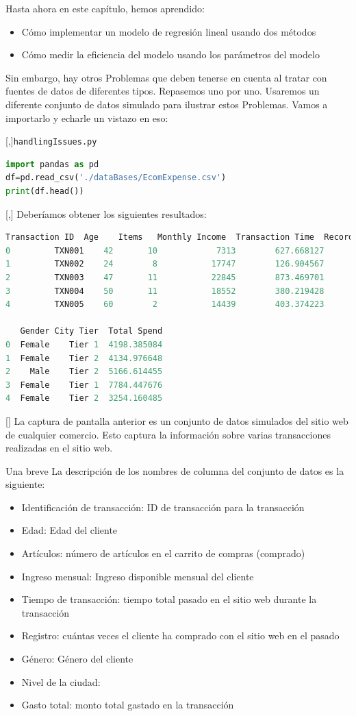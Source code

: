 Hasta ahora en este capítulo, hemos aprendido:
\begin{itemize}
 \item Cómo implementar un modelo de regresión lineal usando dos métodos
 \item Cómo medir la eficiencia del modelo usando los parámetros del modelo
\end{itemize}


Sin embargo, hay otros Problemas que deben tenerse en cuenta al tratar con fuentes de datos de diferentes tipos. Repasemos uno por uno. Usaremos un diferente conjunto de datos simulado para ilustrar estos Problemas. Vamos a importarlo y echarle un vistazo
en eso:

[,]{\texttt{handlingIssues.py}}
\begin{lstlisting}[language=Python]
import pandas as pd
df=pd.read_csv('./dataBases/EcomExpense.csv')
print(df.head())
\end{lstlisting}

[,]{}
Deberíamos obtener los siguientes resultados:

\begin{lstlisting}[language=Python]
  Transaction ID  Age    Items   Monthly Income  Transaction Time  Record  \
0         TXN001    42       10            7313        627.668127       5
1         TXN002    24        8           17747        126.904567       3
2         TXN003    47       11           22845        873.469701       2
3         TXN004    50       11           18552        380.219428       7
4         TXN005    60        2           14439        403.374223       2

   Gender City Tier  Total Spend
0  Female    Tier 1  4198.385084
1  Female    Tier 2  4134.976648
2    Male    Tier 2  5166.614455
3  Female    Tier 1  7784.447676
4  Female    Tier 2  3254.160485
\end{lstlisting}

[]{}
La captura de pantalla anterior es un conjunto de datos simulados del sitio web de cualquier comercio. Esto captura la información sobre varias transacciones realizadas en el sitio web.


Una breve
La descripción de los nombres de columna del conjunto de datos es la siguiente:
\begin{itemize}
 \item Identificación de transacción: ID de transacción para la transacción
\item Edad: Edad del cliente
\item Artículos: número de artículos en el carrito de compras (comprado)
\item Ingreso mensual: Ingreso disponible mensual del cliente
\item Tiempo de transacción: tiempo total pasado en el sitio web durante la transacción
\item Registro: cuántas veces el cliente ha comprado con el sitio web en
el pasado
\item Género: Género del cliente
\item Nivel de la ciudad: ~
\item Gasto total: monto total gastado en la transacción
\end{itemize}




